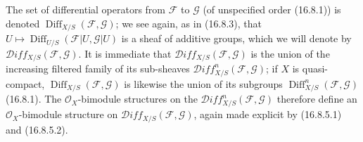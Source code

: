 \begin{env}[16.8.7]
\label{IV.16.8.7}
The set of differential operators from $\mathscr{F}$ to $\mathscr{G}$
(of unspecified order (16.8.1)) is denoted
$\operatorname{Diff}_{X/S}(\mathscr{F},\mathscr{G})$; we see again, as
in (16.8.3), that
$U\mapsto\operatorname{Diff}_{U/S}(\mathscr{F}|U,\mathscr{G}|U)$ is a
sheaf of additive groups, which we will denote by
$\mathscr{D}\!iff_{X/S}(\mathscr{F},\mathscr{G})$. It is immediate that
$\mathscr{D}\!iff_{X/S}(\mathscr{F},\mathscr{G})$ is the union of the
increasing filtered family of its sub-sheaves
$\mathscr{D}\!iff_{X/S}^n(\mathscr{F},\mathscr{G})$; if $X$ is
quasi-compact, $\operatorname{Diff}_{X/S}(\mathscr{F},\mathscr{G})$
is likewise the union of its subgroups
$\operatorname{Diff}_{X/S}^n(\mathscr{F},\mathscr{G})$ (16.8.1). The
$\mathcal{O}_X$-bimodule structures on the
$\mathscr{D}\!iff_{X/S}^n(\mathscr{F},\mathscr{G})$ therefore define an
$\mathcal{O}_X$-bimodule structure on
$\mathscr{D}\!iff_{X/S}(\mathscr{F},\mathscr{G})$, again made explicit by
(16.8.5.1) and (16.8.5.2).


\end{env}
